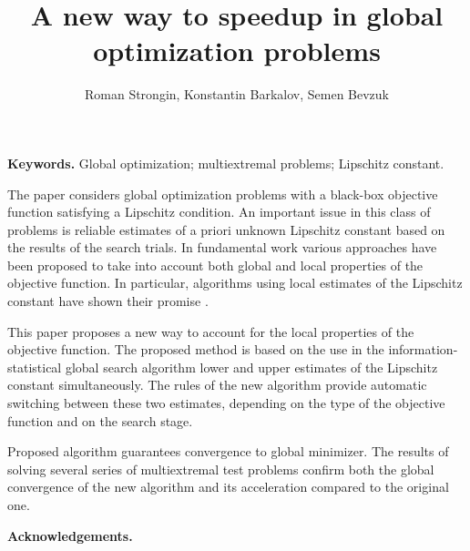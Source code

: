 \documentclass[oribibl]{llncs}
\begin{document}
\cleardoublepage

\title{A new way to speedup in global optimization problems}
\author{Roman Strongin, Konstantin Barkalov, Semen Bevzuk}



\maketitle

\thispagestyle{fancy}

\textbf{Keywords.} Global optimization; multiextremal problems; Lipschitz constant.

 \vspace*{0.5cm}


The paper considers global optimization problems with a black-box objective function satisfying a Lipschitz condition. 
An important issue in this class of problems is reliable estimates of a priori unknown Lipschitz constant based on the results of the search trials. 
In fundamental work \cite{Book} various approaches have been proposed to take into account both global and local properties of the objective function. 
In particular, algorithms using local estimates of the Lipschitz constant have shown their promise \cite{Sergeyev10, Sergeyev16}.

This paper proposes a new way to account for the local properties of the objective function.
The proposed method is based on the use in the information-statistical global search algorithm \cite{Book} lower and upper estimates of the Lipschitz constant simultaneously. 
The rules of the new algorithm provide automatic switching between these two estimates, depending on the type of the objective function and on the search stage.

Proposed algorithm guarantees convergence to global minimizer. The results of solving several series of multiextremal test problems confirm both the global convergence of the new algorithm and its acceleration compared to the original one.

\textbf{Acknowledgements.}
\end{document}
